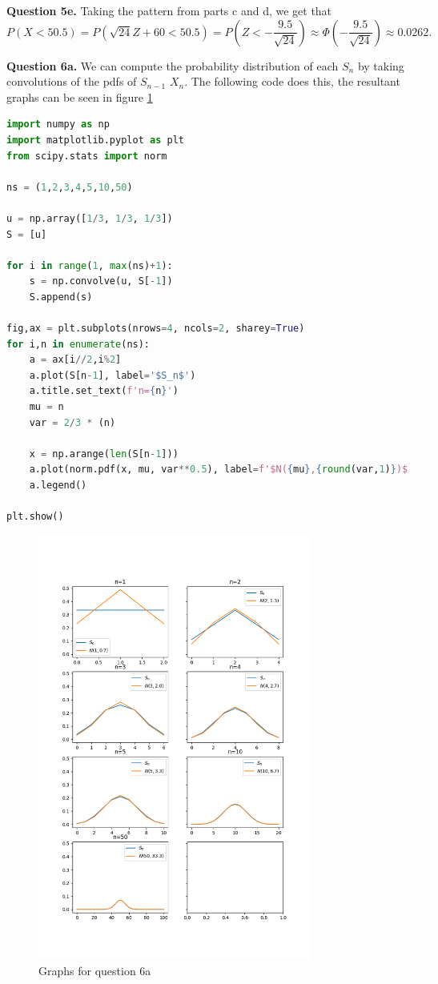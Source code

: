 \documentclass[letterpaper, reqno,11pt]{article}
\begin{document}
{\medskip\noindent\bf Question 5e.} Taking the pattern from parts c and d, we get that 
\[
P(X< 50.5)= P(\sqrt{24} Z+60< 50.5)=P(Z<-\frac{9.5}{\sqrt{24} })\approx \Phi(-\frac{9.5}{\sqrt{24} })\approx 0.0262
.\]

{\medskip\noindent\bf Question 6a.} We can compute the probability distribution of each $S_n$ by taking convolutions of the pdfs of $S_{n-1}$ $X_n$. The following code does this, the resultant graphs can be seen in figure \ref{fig:6a}

\begin{lstlisting}[language=Python]
import numpy as np
import matplotlib.pyplot as plt
from scipy.stats import norm

ns = (1,2,3,4,5,10,50)

u = np.array([1/3, 1/3, 1/3])
S = [u]

for i in range(1, max(ns)+1):
    s = np.convolve(u, S[-1])
    S.append(s)

fig,ax = plt.subplots(nrows=4, ncols=2, sharey=True)
for i,n in enumerate(ns):
    a = ax[i//2,i%2]
    a.plot(S[n-1], label='$S_n$')
    a.title.set_text(f'n={n}')
    mu = n
    var = 2/3 * (n)
    
    x = np.arange(len(S[n-1]))
    a.plot(norm.pdf(x, mu, var**0.5), label=f'$N({mu},{round(var,1)})$')
    a.legend()

plt.show()
\end{lstlisting}

\begin{figure}[htpb]
    \centering
    \includegraphics[width=0.8\textwidth]{6a}
    \caption{Graphs for question 6a}
    \label{fig:6a}
\end{figure}
\end{document}
